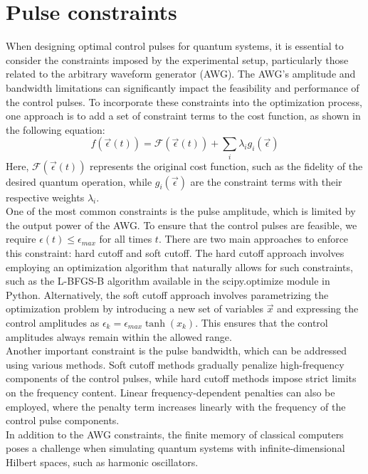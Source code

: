 \documentclass[12pt]{report}
\begin{document}
\section{Pulse constraints} \label{sec:pulse_constraints}
When designing optimal control pulses for quantum systems, it is essential to consider the constraints imposed by the experimental setup, particularly those related to the arbitrary waveform generator (AWG). 
The AWG's amplitude and bandwidth limitations can significantly impact the feasibility and performance of the control pulses. 
To incorporate these constraints into the optimization process, one approach is to add a set of constraint terms to the cost function, as shown in the following equation:
\begin{equation*}
    f(\vec{\epsilon}(t)) = \mathcal{F}(\vec{\epsilon}(t)) + \sum_i \lambda_i g_i(\vec{\epsilon})
\end{equation*}
Here, $\mathcal{F}(\vec{\epsilon}(t))$ represents the original cost function, such as the fidelity of the desired quantum operation, while $g_i(\vec{\epsilon})$ are the constraint terms with their respective weights $\lambda_i$.
\\
One of the most common constraints is the pulse amplitude, which is limited by the output power of the AWG. 
To ensure that the control pulses are feasible, we require $\epsilon(t) \le \epsilon_{max}$ for all times $t$. 
There are two main approaches to enforce this constraint: hard cutoff and soft cutoff. 
The hard cutoff approach involves employing an optimization algorithm that naturally allows for such constraints, such as the L-BFGS-B algorithm available in the scipy.optimize module in Python. 
Alternatively, the soft cutoff approach involves parametrizing the optimization problem by introducing a new set of variables $\vec{x}$ and expressing the control amplitudes as $\epsilon_k = \epsilon_{max} \tanh{(x_k)}$. 
This ensures that the control amplitudes always remain within the allowed range.
\\
Another important constraint is the pulse bandwidth, which can be addressed using various methods. 
Soft cutoff methods gradually penalize high-frequency components of the control pulses, while hard cutoff methods impose strict limits on the frequency content. 
Linear frequency-dependent penalties can also be employed, where the penalty term increases linearly with the frequency of the control pulse components.
\\
In addition to the AWG constraints, the finite memory of classical computers poses a challenge when simulating quantum systems with infinite-dimensional Hilbert spaces, such as harmonic oscillators. 
\end{document}
